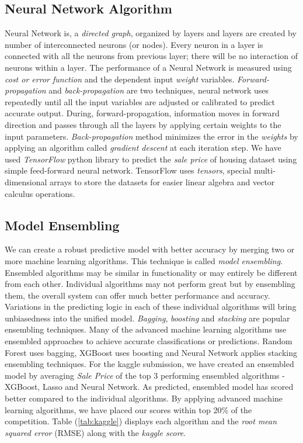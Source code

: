 \documentclass[sigconf]{acmart}
\begin{document}
	\subsection{Neural Network Algorithm}
	Neural Network is, a {\em directed graph}, organized by layers and layers are created by number of interconnected neurons (or nodes). Every neuron in a layer is connected with all the neurons from previous layer; there will be no interaction of neurons within a layer. The performance of a Neural Network is measured using {\em cost or error function} and the dependent input {\em weight} variables. {\em Forward-propagation} and {\em back-propagation} are two techniques, neural network uses repeatedly until all the input variables are adjusted or calibrated to predict accurate output. During, forward-propagation, information moves in forward direction and passes through all the layers by applying certain weights to the input parameters. {\em Back-propagation} method minimizes the error in the {\em weights} by applying an algorithm called {\em gradient descent} at each iteration step. We have used {\em TensorFlow} python library to predict the {\em sale price} of housing dataset using simple feed-forward neural network. TensorFlow uses {\em tensors}, special multi-dimensional arrays to store the datasets for easier linear algebra and vector calculus operations.
			
	\subsection{Model Ensembling}
	We can create a robust predictive model with better accuracy by merging two or more machine learning algorithms. This technique is called {\em model ensembling}. Ensembled algorithms may be similar in functionality or may entirely be different from each other. Individual algorithms may not perform great but by ensembling them, the overall system can offer much better performance and accuracy. Variations in the predicting logic in each of these individual algorithms will bring unbiasedness into the unified model. {\em Bagging}, {\em boosting} and {\em stacking} are popular ensembling techniques. Many of the advanced machine learning algorithms use ensembled approaches to achieve accurate classifications or predictions. Random Forest uses bagging, XGBoost uses boosting and Neural Network applies stacking ensembling techniques. For the kaggle submission, we have created an ensembled model by averaging {\em Sale Price} of the top 3 performing ensembled algorithms - XGBoost, Lasso and Neural Network. As predicted, ensembled model has scored better compared to the individual algorithms. By applying advanced machine learning algorithms, we have placed our scores within top 20\% of the competition. Table (\ref{tab:kaggle}) displays each algorithm and the {\em root mean squared error} (RMSE) along with the {\em kaggle score}.
					
\end{document}
